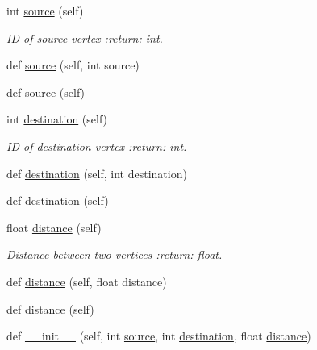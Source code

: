 \begin{DoxyCompactItemize}
\item 
int \mbox{\hyperlink{classbridges_1_1data__src__dependent_1_1osm_1_1_osm_edge_a1247ce6a95e075582fd824201a24af83}{source}} (self)
\begin{DoxyCompactList}\small\item\em ID of source vertex \+:return\+: int. \end{DoxyCompactList}\item 
def \mbox{\hyperlink{classbridges_1_1data__src__dependent_1_1osm_1_1_osm_edge_ad7368b31a5d8713b43a8359065713c24}{source}} (self, int source)
\item 
def \mbox{\hyperlink{classbridges_1_1data__src__dependent_1_1osm_1_1_osm_edge_a52c735a9496d74764fbcf29805d4f372}{source}} (self)
\item 
int \mbox{\hyperlink{classbridges_1_1data__src__dependent_1_1osm_1_1_osm_edge_ab59e74b81084f83a903a31e106bf3d16}{destination}} (self)
\begin{DoxyCompactList}\small\item\em ID of destination vertex \+:return\+: int. \end{DoxyCompactList}\item 
def \mbox{\hyperlink{classbridges_1_1data__src__dependent_1_1osm_1_1_osm_edge_a0f6edd3387c5f5e283750f8b0d4187ea}{destination}} (self, int destination)
\item 
def \mbox{\hyperlink{classbridges_1_1data__src__dependent_1_1osm_1_1_osm_edge_ac3e5f99dd826c60fba46a5db69ee4b12}{destination}} (self)
\item 
float \mbox{\hyperlink{classbridges_1_1data__src__dependent_1_1osm_1_1_osm_edge_a85ea97c86d1659e321167f25c7da1167}{distance}} (self)
\begin{DoxyCompactList}\small\item\em Distance between two vertices \+:return\+: float. \end{DoxyCompactList}\item 
def \mbox{\hyperlink{classbridges_1_1data__src__dependent_1_1osm_1_1_osm_edge_ada8049783c32c99967b6a167c7a0b788}{distance}} (self, float distance)
\item 
def \mbox{\hyperlink{classbridges_1_1data__src__dependent_1_1osm_1_1_osm_edge_ae20fb44608780d4f10f55c1a85e4d410}{distance}} (self)
\item 
def \mbox{\hyperlink{classbridges_1_1data__src__dependent_1_1osm_1_1_osm_edge_aa3aa5332733e8eecc9074127837fc287}{\+\_\+\+\_\+init\+\_\+\+\_\+}} (self, int \mbox{\hyperlink{classbridges_1_1data__src__dependent_1_1osm_1_1_osm_edge_a968664892933e9784909282cc53b0315}{source}}, int \mbox{\hyperlink{classbridges_1_1data__src__dependent_1_1osm_1_1_osm_edge_aa81426d41bd031b2fa3789173206c0dc}{destination}}, float \mbox{\hyperlink{classbridges_1_1data__src__dependent_1_1osm_1_1_osm_edge_aed843c7fcb887bb11b609387fc3af35f}{distance}})

\end{DoxyCompactItemize}
